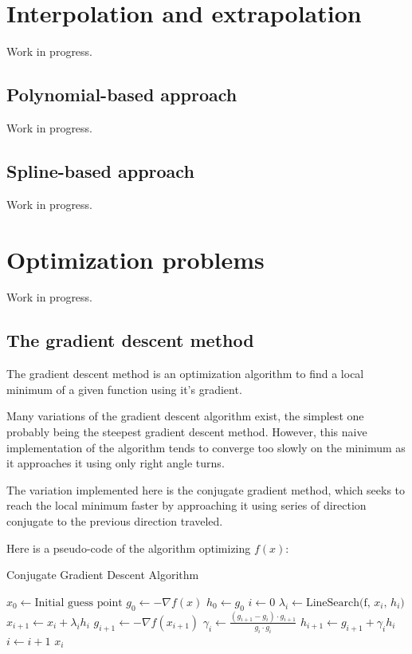 \documentclass{book}
\begin{document}
\section{Interpolation and extrapolation}

Work in progress.

\subsection{Polynomial-based approach}

Work in progress.

\subsection{Spline-based approach}

Work in progress.

\section{Optimization problems}

Work in progress.

\subsection{The gradient descent method}
The gradient descent method is an optimization algorithm to find a local minimum of a given function using it's gradient.

Many variations of the gradient descent algorithm exist, the simplest one probably being the steepest gradient descent method. However, this naive implementation of the algorithm tends to converge too slowly on the minimum as it approaches it using only right angle turns.

The variation implemented here is the conjugate gradient method, which seeks to reach the local minimum faster by approaching it using series of direction conjugate to the previous direction traveled.

Here is a pseudo-code of the algorithm optimizing $f(x)$:

\begin{algorithm}
  \caption{Conjugate Gradient Descent Algorithm}
  \begin{algorithmic}[1]
    \State $x_{0} \gets \text{Initial guess point}$
    \State $g_{0} \gets -\nabla f(x)$ 
    \State $h_{0} \gets g_{0}$ 
    \State $i \gets 0$
    
    \State $\lambda_{i} \gets \text{LineSearch(f, $x_{i}$, $h_{i}$)}$
    \State $x_{i+1} \gets x_{i} + \lambda_{i} h_{i}$
    \State $g_{i+1} \gets -\nabla f(x_{i+1})$
    \State $\gamma_{i} \gets \frac{(g_{i+1} - g_{i}) \cdot g_{i+1}}{g_{i} \cdot g_{i}}$ 
    \State $h_{i+1} \gets g_{i+1} + \gamma_{i} h_{i}$
    \State $i \gets i + 1$
  \EndWhile
    \State \Return $x_{i}$
  \end{algorithmic}
\end{algorithm}
\end{document}
